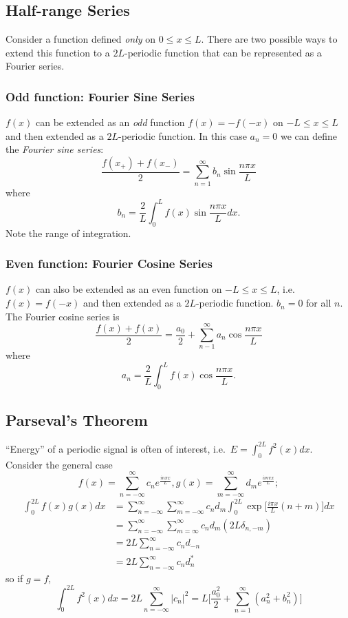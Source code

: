 \documentclass[a4paper]{article}
\begin{document}
\subsection{Half-range Series}

Consider a function defined \emph{only} on \(0 \leq x \leq L\). There are two possible ways to extend this function to a \(2L\)-periodic function that can be represented as a Fourier series.

\subsubsection{Odd function: Fourier Sine Series}

\(f(x)\) can be extended as an \emph{odd} function \(f(x)=-f(-x)\) on \(-L \leq x \leq L\) and then extended as a \(2L\)-periodic function. In this case \(a_n=0\) we can define the \emph{Fourier sine series}:
\[
  \frac{f(x_+)+f(x_-)}{2} = \sum_{n=1}^{\infty}b_n \sin \frac{n\pi x}{L}
\]
where
\[
  b_n = \frac{2}{L} \int_{0}^{L} f(x) \sin \frac{n\pi x}{L} dx.
\]
Note the range of integration.

\begin{eg}
  
\end{eg}

\subsubsection{Even function: Fourier Cosine Series}

\(f(x)\) can also be extended as an even function on \(-L\leq x\leq L\), i.e.\ \(f(x) = f(-x)\) and then extended as a \(2L\)-periodic function. \(b_n=0\) for all \(n\). The Fourier cosine series is
\[
  \frac{f(x)+f(x)}{2} = \frac{a_0}{2} + \sum_{n-1}^{\infty}a_n \cos \frac{n\pi x}{L}
\]
where
\[
  a_n = \frac{2}{L}\int_{0}^{L}f(x)\cos \frac{n\pi x}{L}.
\]

\subsection{Parseval's Theorem}

``Energy'' of a periodic signal is often of interest, i.e.\ \(E = \int_{0}^{2L}f^2(x) dx \). Consider the general case
\[
  f(x) = \sum_{n=-\infty}^{\infty}c_n e^{\frac{in\pi x}{L}}, g(x) = \sum_{m=-\infty}^{\infty}d_m e^{\frac{im\pi x}{L}};
\]
\begin{align*}
  \int_{0}^{2L} f(x) g(x) dx &= \sum_{n=-\infty}^{\infty} \sum_{m=-\infty}^{\infty} c_n d_m \int_{0}^{2L} \exp \Big [\frac{i\pi x}{L} (n+m) \Big] dx \\
  &= \sum_{n=-\infty}^{\infty} \sum_{m=\infty}^{\infty} c_n d_m (2L \delta_{n,-m}) \\
  &= 2L \sum_{n=-\infty}^{\infty} c_n d_{-n} \\
  &= 2L \sum_{n=-\infty}^{\infty} c_n d_n^*
  \end{align*}
so if \(g=f\),
\[
  \int_{0}^{2L} f^2(x) dx = 2L \sum_{n=-\infty}^{\infty}|c_n|^2 = L \Big[ \frac{a_0^2}{2} + \sum_{n=1}^{\infty}(a_n^2+b_n^2) \Big]
\]
\end{document}
